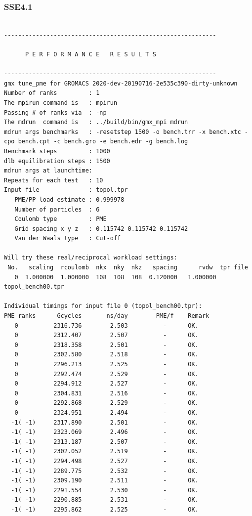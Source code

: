 \subsubsection{SSE4.1}
\begin{lstlisting}[frame=single]

------------------------------------------------------------

      P E R F O R M A N C E   R E S U L T S

------------------------------------------------------------
gmx tune_pme for GROMACS 2020-dev-20190716-2e535c390-dirty-unknown
Number of ranks         : 1
The mpirun command is   : mpirun
Passing # of ranks via  : -np
The mdrun  command is   : ../build/bin/gmx_mpi mdrun
mdrun args benchmarks   : -resetstep 1500 -o bench.trr -x bench.xtc -cpo bench.cpt -c bench.gro -e bench.edr -g bench.log 
Benchmark steps         : 1000
dlb equilibration steps : 1500
mdrun args at launchtime: 
Repeats for each test   : 10
Input file              : topol.tpr
   PME/PP load estimate : 0.999978
   Number of particles  : 6
   Coulomb type         : PME
   Grid spacing x y z   : 0.115742 0.115742 0.115742
   Van der Waals type   : Cut-off

Will try these real/reciprocal workload settings:
 No.   scaling  rcoulomb  nkx  nky  nkz   spacing      rvdw  tpr file
   0  1.000000  1.000000  108  108  108  0.120000   1.000000  topol_bench00.tpr

Individual timings for input file 0 (topol_bench00.tpr):
PME ranks      Gcycles       ns/day        PME/f    Remark
   0          2316.736        2.503          -      OK.
   0          2312.407        2.507          -      OK.
   0          2318.358        2.501          -      OK.
   0          2302.580        2.518          -      OK.
   0          2296.213        2.525          -      OK.
   0          2292.474        2.529          -      OK.
   0          2294.912        2.527          -      OK.
   0          2304.831        2.516          -      OK.
   0          2292.868        2.529          -      OK.
   0          2324.951        2.494          -      OK.
  -1( -1)     2317.890        2.501          -      OK.
  -1( -1)     2323.069        2.496          -      OK.
  -1( -1)     2313.187        2.507          -      OK.
  -1( -1)     2302.052        2.519          -      OK.
  -1( -1)     2294.498        2.527          -      OK.
  -1( -1)     2289.775        2.532          -      OK.
  -1( -1)     2309.190        2.511          -      OK.
  -1( -1)     2291.554        2.530          -      OK.
  -1( -1)     2290.885        2.531          -      OK.
  -1( -1)     2295.862        2.525          -      OK.


\end{lstlisting}

